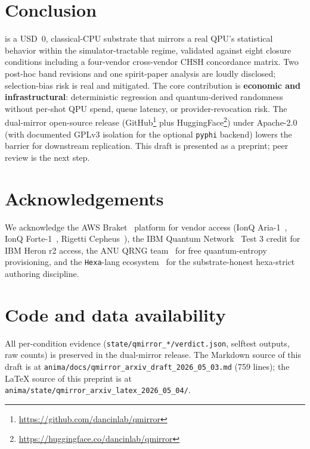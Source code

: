 \section{Conclusion}\label{sec:conclusion}

\qmirror{} is a USD~0, classical-CPU substrate that mirrors a real
QPU's statistical behavior within the simulator-tractable regime,
validated against eight closure conditions including a four-vendor
cross-vendor CHSH concordance matrix. Two post-hoc band revisions and
one spirit-paper analysis are loudly disclosed; selection-bias risk
is real and mitigated. The core contribution is \textbf{economic and
infrastructural}: deterministic regression and quantum-derived
randomness without per-shot QPU spend, queue latency, or
provider-revocation risk. The dual-mirror open-source release
(GitHub\footnote{\url{https://github.com/dancinlab/qmirror}}
plus HuggingFace\footnote{\url{https://huggingface.co/dancinlab/qmirror}})
under Apache-2.0 (with documented GPLv3 isolation for the optional
\texttt{pyphi} backend) lowers the barrier for downstream
replication. This draft is presented as a preprint; peer review is
the next step.

\section*{Acknowledgements}

We acknowledge the AWS Braket~\cite{AWS-Braket} platform for vendor
access (IonQ Aria-1~\cite{IonQ-Aria}, IonQ Forte-1~\cite{IonQ-Forte},
Rigetti Cepheus~\cite{Rigetti-Cepheus}), the IBM Quantum
Network~\cite{IBM-Heron} Test 3 credit for IBM Heron r2 access, the
ANU QRNG team~\cite{ANU-QRNG} for free quantum-entropy provisioning,
and the \texttt{Hexa}-lang ecosystem~\cite{Hexa-Lang} for the
substrate-honest hexa-strict authoring discipline.

\section*{Code and data availability}

All per-condition evidence (\texttt{state/qmirror\_*/verdict.json},
selftest outputs, raw counts) is preserved in the dual-mirror
release. The Markdown source of this draft is at
\texttt{anima/docs/qmirror\_arxiv\_draft\_2026\_05\_03.md} (759
lines); the LaTeX source of this preprint is at
\texttt{anima/state/qmirror\_arxiv\_latex\_2026\_05\_04/}.
